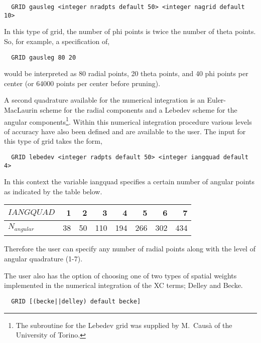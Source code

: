 \begin{verbatim}
  GRID gausleg <integer nradpts default 50> <integer nagrid default 10> 
\end{verbatim}

In this type of grid, the number of phi points is twice the number of
theta points. So, for example, a specification of,
\begin{verbatim}
  GRID gausleg 80 20
\end{verbatim}
would be interpreted as 80 radial points, 20 theta points, and 40
phi points per center (or 64000 points per center before pruning).

A second quadrature available for the numerical integration is an
Euler-Mac\-Laurin scheme for the radial components and a Lebedev
scheme for the angular components\footnote{The subroutine 
for the Lebedev grid was supplied by M.~Caus\`a of the University of
Torino.}.  Within this numerical integration procedure various levels 
of accuracy have also been defined and are available to the user.  
The input for this type of grid takes the form,
\begin{verbatim}
  GRID lebedev <integer radpts default 50> <integer iangquad default 4> 
\end{verbatim}
In this context the variable iangquad specifies a certain number of
angular points as indicated by the table below.

{\center
  \begin{tabular}[right]{|l|r r r r r r r|} \hline
$IANGQUAD$ & 1 & 2 & 3 & 4 & 5 & 6 & 7 \\ \hline
$N_{angular}$ & 38 & 50 & 110 & 194 & 266 & 302 & 434 \\  \hline
  \end{tabular}
}

Therefore the user can specify any number of radial points along with
the level of angular quadrature (1-7).

%

The user also has the option of choosing one of two types of spatial weights
implemented in the numerical integration of the XC terms; Delley and Becke.

\begin{verbatim}
  GRID [(becke||delley) default becke]
\end{verbatim}

